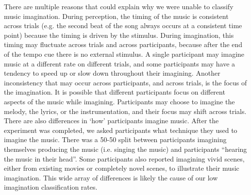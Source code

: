 There are multiple reasons that could explain why we were unable to classify music imagination.
During perception, the timing of the music is consistent across trials (e.g. the second beat of the song always occurs at a consistent time point) because the timing is driven by the stimulus. 
During imagination, this timing may fluctuate across trials and across participants, because after the end of the tempo cue there is no external stimulus.
A single participant may imagine music at a different rate on different trials, and some participants may have a tendency to speed up or slow down throughout their imagining. 
Another inconsistency that may occur across participants, and across trials, is the focus of the imagination. 
It is possible that different participants focus on different aspects of the music while imagining.
Participants may choose to imagine the melody, the lyrics, or the instrumentation, and their focus may shift across trials.
There are also differences in `how' participants imagine music. 
After the experiment was completed, we asked participants what technique they used to imagine the music.
There was a 50-50 split between participants imagining themselves producing the music (i.e. singing the music) and participants ``hearing the music in their head''. 
Some participants also reported imagining vivid scenes, either from existing movies or completely novel scenes, to illustrate their music imagination.
This wide array of differences is likely the cause of our low imagination classification rates. 

